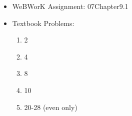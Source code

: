 \documentclass[12pt]{article}
\begin{document}
\begin{itemize}
\setlength{\itemsep}{0mm}
\item WeBWorK Assignment: 07Chapter9.1
\item Textbook Problems:
  \begin{enumerate}
  \setlength{\itemsep}{-1mm}
    \item 2
    \item 4
    \item 8
    \item 10
    \item 20-28 (even only)
  \end{enumerate}
\end{itemize}
\end{document}
